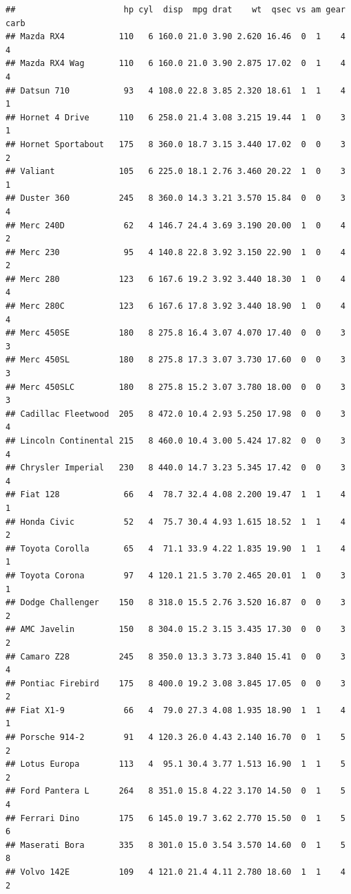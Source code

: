 \documentclass[]{article}
\begin{document}
\begin{verbatim}
##                      hp cyl  disp  mpg drat    wt  qsec vs am gear carb
## Mazda RX4           110   6 160.0 21.0 3.90 2.620 16.46  0  1    4    4
## Mazda RX4 Wag       110   6 160.0 21.0 3.90 2.875 17.02  0  1    4    4
## Datsun 710           93   4 108.0 22.8 3.85 2.320 18.61  1  1    4    1
## Hornet 4 Drive      110   6 258.0 21.4 3.08 3.215 19.44  1  0    3    1
## Hornet Sportabout   175   8 360.0 18.7 3.15 3.440 17.02  0  0    3    2
## Valiant             105   6 225.0 18.1 2.76 3.460 20.22  1  0    3    1
## Duster 360          245   8 360.0 14.3 3.21 3.570 15.84  0  0    3    4
## Merc 240D            62   4 146.7 24.4 3.69 3.190 20.00  1  0    4    2
## Merc 230             95   4 140.8 22.8 3.92 3.150 22.90  1  0    4    2
## Merc 280            123   6 167.6 19.2 3.92 3.440 18.30  1  0    4    4
## Merc 280C           123   6 167.6 17.8 3.92 3.440 18.90  1  0    4    4
## Merc 450SE          180   8 275.8 16.4 3.07 4.070 17.40  0  0    3    3
## Merc 450SL          180   8 275.8 17.3 3.07 3.730 17.60  0  0    3    3
## Merc 450SLC         180   8 275.8 15.2 3.07 3.780 18.00  0  0    3    3
## Cadillac Fleetwood  205   8 472.0 10.4 2.93 5.250 17.98  0  0    3    4
## Lincoln Continental 215   8 460.0 10.4 3.00 5.424 17.82  0  0    3    4
## Chrysler Imperial   230   8 440.0 14.7 3.23 5.345 17.42  0  0    3    4
## Fiat 128             66   4  78.7 32.4 4.08 2.200 19.47  1  1    4    1
## Honda Civic          52   4  75.7 30.4 4.93 1.615 18.52  1  1    4    2
## Toyota Corolla       65   4  71.1 33.9 4.22 1.835 19.90  1  1    4    1
## Toyota Corona        97   4 120.1 21.5 3.70 2.465 20.01  1  0    3    1
## Dodge Challenger    150   8 318.0 15.5 2.76 3.520 16.87  0  0    3    2
## AMC Javelin         150   8 304.0 15.2 3.15 3.435 17.30  0  0    3    2
## Camaro Z28          245   8 350.0 13.3 3.73 3.840 15.41  0  0    3    4
## Pontiac Firebird    175   8 400.0 19.2 3.08 3.845 17.05  0  0    3    2
## Fiat X1-9            66   4  79.0 27.3 4.08 1.935 18.90  1  1    4    1
## Porsche 914-2        91   4 120.3 26.0 4.43 2.140 16.70  0  1    5    2
## Lotus Europa        113   4  95.1 30.4 3.77 1.513 16.90  1  1    5    2
## Ford Pantera L      264   8 351.0 15.8 4.22 3.170 14.50  0  1    5    4
## Ferrari Dino        175   6 145.0 19.7 3.62 2.770 15.50  0  1    5    6
## Maserati Bora       335   8 301.0 15.0 3.54 3.570 14.60  0  1    5    8
## Volvo 142E          109   4 121.0 21.4 4.11 2.780 18.60  1  1    4    2
\end{verbatim}
\end{document}
